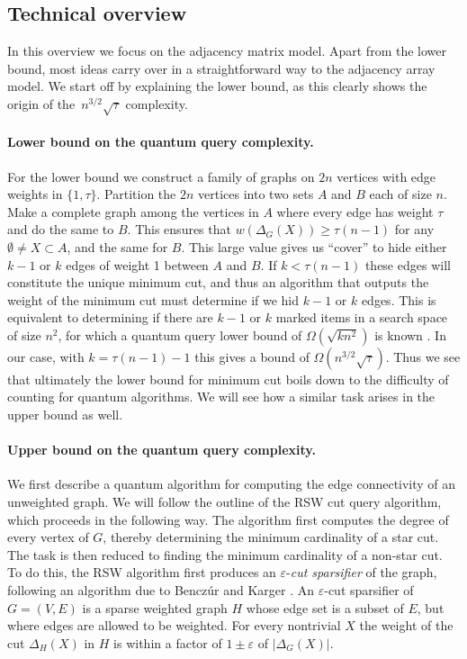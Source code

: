 \documentclass[10pt,a4paper]{article}
\newcommand{\1}{\mathbf{1}}
\theoremstyle{definition}
\begin{document}
\subsection{Technical overview}
In this overview we focus on the adjacency matrix model.
Apart from the lower bound, most ideas carry over in a straightforward way to the adjacency array model.  
We start off by explaining the lower bound, as this clearly shows the origin of the~$n^{3/2} \sqrt{\tau}$ complexity.  

\paragraph*{Lower bound on the quantum query complexity.}
For the lower bound we construct a family of graphs on $2n$ vertices with edge weights in $\{1,\tau\}$.  Partition the $2n$ vertices into two sets $A$ and $B$ each of size $n$.  Make 
a complete graph among the vertices in $A$ where every edge has weight $\tau$ and do the same to $B$.  This ensures that $w(\Delta_G(X)) \ge \tau (n-1)$ for any $\emptyset \ne X \subset A$, 
and the same for $B$.  This large value gives us ``cover'' to hide either $k-1$ or $k$ edges of weight 1 between $A$ and $B$.  If $k < \tau(n-1)$ these edges will 
constitute the unique minimum cut, and thus an algorithm that outputs the weight of the minimum cut must determine if we hid $k-1$ or $k$ edges.  This is equivalent to 
determining if there are $k-1$ or $k$ marked items in a search space of size $n^2$, for which a quantum query lower bound of $\Omega(\sqrt{kn^2})$ is known \cite{NW99}.  In our case, with $k = \tau (n-1) -1$ 
this gives a bound of $\Omega(n^{3/2}\sqrt{\tau})$.  Thus we see that ultimately the lower bound for minimum cut boils down to the difficulty of counting for quantum algorithms.  
We will see how a similar task arises in the upper bound as well.  

\paragraph*{Upper bound on the quantum query complexity.}
We first describe a quantum algorithm for computing the edge connectivity of an unweighted graph.  We will follow the outline of the 
RSW cut query algorithm, which proceeds in the following way.  The algorithm first computes the degree of every vertex of $G$, thereby determining the minimum cardinality of a star cut.  The task is then reduced to finding 
the minimum cardinality of a non-star cut.  To do this, the RSW algorithm first produces an $\varepsilon$-\emph{cut sparsifier} of the graph, following an algorithm due to 
Bencz\'{u}r and Karger \cite{BK15}.  An $\varepsilon$-cut sparsifier of $G = (V,E)$ is a sparse weighted graph $H$ whose edge set is a subset of $E$, but where edges 
are allowed to be weighted.  For every nontrivial $X$ the weight of the cut $\Delta_H(X)$ in $H$ is within a factor of $1 \pm \varepsilon$ of $|\Delta_G(X)|$.  
\end{document}
